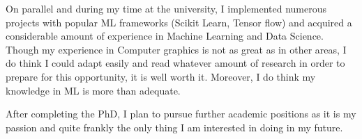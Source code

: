 \documentclass[11pt, a4paper]{awesome-cv}
\begin{document}
\begin{cvletter}
  On parallel and during my time at the university, I implemented numerous projects with popular ML frameworks
  (Scikit Learn, Tensor flow) and acquired a considerable amount of experience in Machine Learning and Data Science.
  Though my experience in Computer graphics is not as great as in other areas, I do think I could adapt easily
  and read whatever amount of research in order to prepare for this opportunity, it is well worth it. Moreover, I do 
  think my knowledge in ML is more than adequate.
  
  After completing the PhD, I plan to pursue further academic positions as it is my passion and quite frankly the only thing I am interested in doing in my future.

\end{cvletter}

\makeletterclosing
\end{document}
